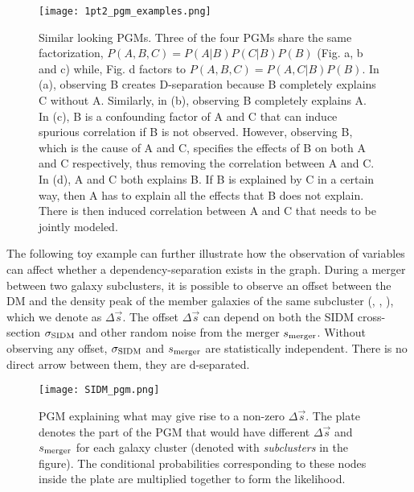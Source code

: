 \begin{figure*}[h]
	\begin{center}
	\texttt{[image: 1pt2\_pgm\_examples.png]}
	\caption{
		Similar looking PGMs.	Three of the four PGMs share the same factorization, 
		$P(A, B, C) = P(A | B) P(C | B) P(B)$ (Fig.
		a, b and c) while, Fig. d factors to $P(A, B, C) = P(A, C |
		B) P(B)$. In (a), observing B creates D-separation because B completely
		explains C without A. Similarly, in (b), observing B completely explains A. 
		In (c), B is a confounding factor of A and C that can induce spurious
		correlation if B is not observed.
		However, observing B, which is the cause of A and C, specifies
		the effects of B on both A and C respectively, thus removing the correlation between A and C. 
		In (d), A and C both explains B. If B is explained by C
		in a certain way, then A has to explain all the effects that B
		does not explain. There is then induced correlation between A and C that
		needs to be jointly modeled. 
		\label{fig:pgm_examples}
	}
	\end{center}
\end{figure*}

The following toy example can further illustrate how the observation of variables
can affect whether a dependency-separation exists in the graph. 
During a merger between two galaxy subclusters, it is possible to observe an
offset between the DM and the density peak of the member galaxies of the
same subcluster (\citealt{Markevitch2004}, \citealt{Dawson12}, \citealt{Ng2014}), 
which we denote as  $\Delta \vec{s}$. The offset $\Delta \vec{s}$ can depend on both 
the SIDM cross-section $\sigma_{\rm SIDM}$ and other random noise from the 
merger $s_{\rm merger}$. 
Without observing any offset, $\sigma_{\rm SIDM}$ and $s_{\rm merger}$ are
statistically independent. There is no direct arrow between them, they are
d-separated. 

\begin{figure*}[h]
	\begin{center}
	\texttt{[image: SIDM\_pgm.png]}
	\caption{PGM explaining what may give rise to a non-zero $\Delta \vec{s}$.
		The plate denotes the part of the PGM that would have different 
		$\Delta \vec{s}$ and $s_{\rm merger}$ for each galaxy cluster (denoted
		with {\it subclusters} in the figure).
		The conditional probabilities corresponding to these nodes inside the plate
		are multiplied together to form the likelihood.
		\label{fig:SIDM_inference}
	}
	\end{center}
\end{figure*}

